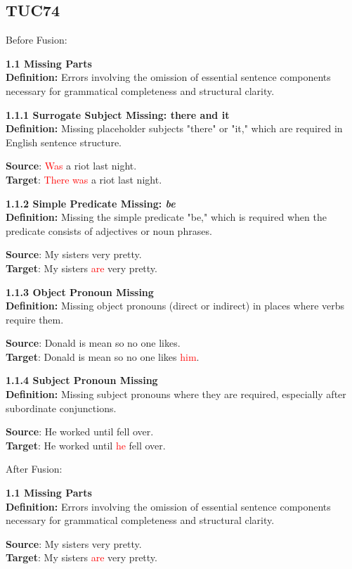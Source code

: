 \subsection{TUC74}

Before Fusion:
\begin{tcolorbox}[breakable]
\noindent \textbf{1.1 Missing Parts}\\
\textbf{Definition:} Errors involving the omission of essential sentence components necessary for grammatical completeness and structural clarity.

\noindent \textbf{1.1.1 Surrogate Subject Missing: there and it}\\
\textbf{Definition:} Missing placeholder subjects "there" or "it," which are required in English sentence structure.


\textbf{Source}: \textcolor{red}{Was} a riot last night. \\
\textbf{Target}: \textcolor{red}{There was} a riot last night.


\noindent \textbf{1.1.2 Simple Predicate Missing: \textit{be}}\\
\textbf{Definition:} Missing the simple predicate "be," which is required when the predicate consists of adjectives or noun phrases.


\textbf{Source}: My sisters very pretty. \\
\textbf{Target}: My sisters \textcolor{red}{are} very pretty.


\noindent \textbf{1.1.3 Object Pronoun Missing}\\
\textbf{Definition:} Missing object pronouns (direct or indirect) in places where verbs require them.


\textbf{Source}: Donald is mean so no one likes. \\
\textbf{Target}: Donald is mean so no one likes \textcolor{red}{him}.


\noindent \textbf{1.1.4 Subject Pronoun Missing}\\
\textbf{Definition:} Missing subject pronouns where they are required, especially after subordinate conjunctions.


\textbf{Source}: He worked until fell over. \\
\textbf{Target}: He worked until \textcolor{red}{he} fell over.

\end{tcolorbox}
\noindent After Fusion:
\begin{tcolorbox}[breakable]
\noindent \textbf{1.1 Missing Parts}\\
\textbf{Definition:} Errors involving the omission of essential sentence components necessary for grammatical completeness and structural clarity.

\textbf{Source}: My sisters very pretty. \\
\textbf{Target}: My sisters \textcolor{red}{are} very pretty.

\end{tcolorbox}

